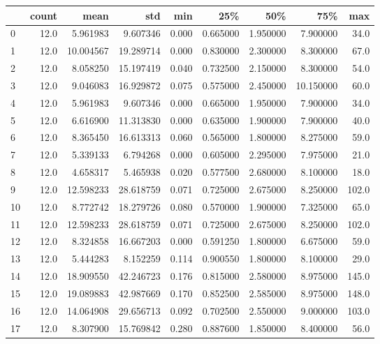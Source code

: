 \begin{tabular}{lrrrrrrrr}
\toprule
{} &  count &       mean &        std &    min &       25\% &       50\% &        75\% &    max \\
\midrule
0    &   12.0 &   5.961983 &   9.607346 &  0.000 &  0.665000 &  1.950000 &   7.900000 &   34.0 \\
1    &   12.0 &  10.004567 &  19.289714 &  0.000 &  0.830000 &  2.300000 &   8.300000 &   67.0 \\
2    &   12.0 &   8.058250 &  15.197419 &  0.040 &  0.732500 &  2.150000 &   8.300000 &   54.0 \\
3    &   12.0 &   9.046083 &  16.929872 &  0.075 &  0.575000 &  2.450000 &  10.150000 &   60.0 \\
4    &   12.0 &   5.961983 &   9.607346 &  0.000 &  0.665000 &  1.950000 &   7.900000 &   34.0 \\
5    &   12.0 &   6.616900 &  11.313830 &  0.000 &  0.635000 &  1.900000 &   7.900000 &   40.0 \\
6    &   12.0 &   8.365450 &  16.613313 &  0.060 &  0.565000 &  1.800000 &   8.275000 &   59.0 \\
7    &   12.0 &   5.339133 &   6.794268 &  0.000 &  0.605000 &  2.295000 &   7.975000 &   21.0 \\
8    &   12.0 &   4.658317 &   5.465938 &  0.020 &  0.577500 &  2.680000 &   8.100000 &   18.0 \\
9    &   12.0 &  12.598233 &  28.618759 &  0.071 &  0.725000 &  2.675000 &   8.250000 &  102.0 \\
10   &   12.0 &   8.772742 &  18.279726 &  0.080 &  0.570000 &  1.900000 &   7.325000 &   65.0 \\
11   &   12.0 &  12.598233 &  28.618759 &  0.071 &  0.725000 &  2.675000 &   8.250000 &  102.0 \\
12   &   12.0 &   8.324858 &  16.667203 &  0.000 &  0.591250 &  1.800000 &   6.675000 &   59.0 \\
13   &   12.0 &   5.444283 &   8.152259 &  0.114 &  0.900550 &  1.800000 &   8.100000 &   29.0 \\
14   &   12.0 &  18.909550 &  42.246723 &  0.176 &  0.815000 &  2.580000 &   8.975000 &  145.0 \\
15   &   12.0 &  19.089883 &  42.987669 &  0.170 &  0.852500 &  2.585000 &   8.975000 &  148.0 \\
16   &   12.0 &  14.064908 &  29.656713 &  0.092 &  0.702500 &  2.550000 &   9.000000 &  103.0 \\
17   &   12.0 &   8.307900 &  15.769842 &  0.280 &  0.887600 &  1.850000 &   8.400000 &   56.0 \\

\end{tabular}
